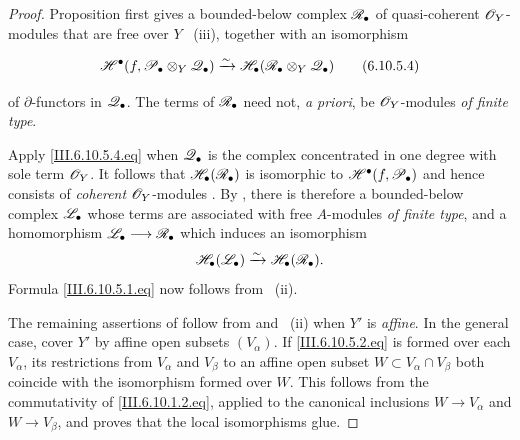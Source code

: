 \begin{proof}
Proposition  first gives a bounded-below
complex $\mathscr{R}_\bullet$  of quasi-coherent
$\mathscr{O}_Y$-modules that are free over $Y$
~(iii), together with an isomorphism
\begin{env}[6.10.5.4]
\label{III.6.10.5.4}
\[
  \mathscr{H}^\bullet
  (f,\mathscr{P}_\bullet\otimes_Y\mathscr{Q}_\bullet)
  \xrightarrow{\sim}
  \mathscr{H}_\bullet
  (\mathscr{R}_\bullet\otimes_Y\mathscr{Q}_\bullet)
  \tag{6.10.5.4}\label{III.6.10.5.4.eq}
\]
\end{env}
of $\partial$-functors in $\mathscr{Q}_\bullet$.  The terms of
$\mathscr{R}_\bullet$ need not, \emph{a priori}, be
$\mathscr{O}_Y$-modules \emph{of finite type}.

Apply \eqref{III.6.10.5.4.eq} when $\mathscr{Q}_\bullet$ is the
complex concentrated in one degree with sole term $\mathscr{O}_Y$.
It follows that $\mathscr{H}_\bullet(\mathscr{R}_\bullet)$ is isomorphic to
$\mathscr{H}^\bullet(f,\mathscr{P}_\bullet)$ and hence consists of \emph{coherent}
$\mathscr{O}_Y$-modules .  By
, there is therefore a bounded-below complex
$\mathscr{L}_\bullet$ whose terms are associated with free
$A$-modules \emph{of finite type}, and a homomorphism $\mathscr{L}_\bullet\longrightarrow\mathscr{R}_\bullet$
which induces an isomorphism
\[
  \mathscr{H}_\bullet(\mathscr{L}_\bullet)
  \xrightarrow{\sim}
  \mathscr{H}_\bullet(\mathscr{R}_\bullet).
\]
Formula \eqref{III.6.10.5.1.eq} now follows from
~(ii).

The remaining assertions of  follow from
 and ~(ii) when $Y'$ is
\emph{affine}.  In the general case, cover $Y'$ by affine open subsets
$(V_\alpha)$.  If
\eqref{III.6.10.5.2.eq} is formed over each $V_\alpha$, its
restrictions from $V_\alpha$ and $V_\beta$ to an affine open
subset $W\subset V_\alpha\cap V_\beta$
both coincide with the isomorphism formed over $W$.  This
follows from the commutativity of
\eqref{III.6.10.1.2.eq}, applied to the canonical inclusions
$W\to V_\alpha$ and $W\to V_\beta$, and proves that the local
isomorphisms glue.
\end{proof}


